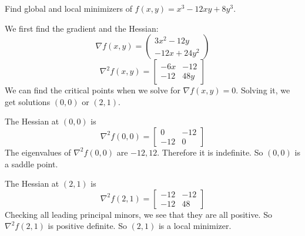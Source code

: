 \begin{problem}
    Find global and local minimizers of $f(x,y) = x^3 - 12xy + 8y^3$.
  
    \bigskip
    We first find the gradient and the Hessian:
    $$\nabla f(x,y) = \begin{pmatrix}
      3x^2 - 12y \\
      -12x + 24y^2
    \end{pmatrix}$$
    $$\nabla^2 f(x,y) = \begin{bmatrix}
      -6x & -12 \\
      -12 & 48y
    \end{bmatrix}$$
    We can find the critical points when we solve for $\nabla f(x,y) = 0$. Solving it, we get solutions $(0,0)$ or $(2,1)$.
  
    The Hessian at $(0,0)$ is $$\nabla^2 f(0,0) = \begin{bmatrix}
      0 & -12 \\
      -12 & 0
    \end{bmatrix}$$ The eigenvalues of $\nabla^2 f(0,0)$ are $-12, 12$. Therefore it is indefinite. So $(0,0)$ is a saddle point.
  
    The Hessian at $(2,1)$ is $$\nabla^2 f(2,1) = \begin{bmatrix}
      -12 & -12 \\
      -12 & 48
    \end{bmatrix}$$ Checking all leading principal minors, we see that they are all positive. So $\nabla^2 f(2,1)$ is positive definite. So $(2,1)$ is a local minimizer.
  \end{problem}

% 